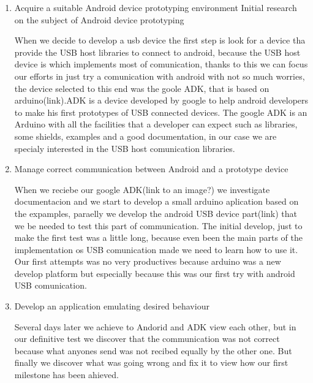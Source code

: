 		\begin{enumerate}

		\item Acquire a suitable Android device prototyping environment
		Initial research on the subject of Android device prototyping 


		When we decide to develop a usb device the first step is look for a device tha provide the USB host libraries to connect to android, because the USB host device is which implements most of comunication, thanks to this we can focus our efforts in just try a comunication with android with not so much worries, the device selected to this end was the goole ADK, that is based on arduino(link).ADK is a device developed by google to help android developers to make his first prototypes of USB connected devices. The google ADK is an Arduino with all the facilities that a developer can expect such as libraries, some shields, examples and a good documentation, in our case we are specialy interested in the USB host comunication libraries.\\

		\item Manage correct communication between Android and a prototype device

		
		 When we reciebe our google ADK(link to an image?) we investigate documentacion and we start to develop a small arduino aplication based on the expamples, paraelly we develop the android USB device part(link) that we be needed to test this part of  communication. The initial develop, just to make the first test was a little long, because even been the main parts of the implementation os USB comunication made we need to learn how to use it. Our first attempts was no very productives because arduino was a new develop platform but especially because this was our first try with android USB comunication. \\

		\item Develop an application emulating desired behaviour

		Several days later we achieve to Andorid and ADK view each other, but in our definitive test we discover that the communication was not correct because what anyones send was not recibed equally by the other one. But finally we discover what was going wrong and fix it to view how our first milestone has been ahieved.\\

		\end{enumerate}

